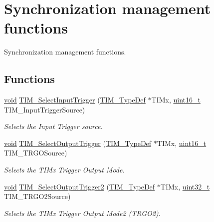 \hypertarget{group___t_i_m___group7}{\section{Synchronization management functions}
\label{group___t_i_m___group7}
}


Synchronization management functions.  


\subsection*{Functions}
\begin{DoxyCompactItemize}
\item 
\hyperlink{group___n_a_m_e_ga18028b8badbf1ea7e704ccac3c488e82}{void} \hyperlink{group___t_i_m___group7_ga4252583c6ae8a73d6fc66f7e951dbc35}{T\-I\-M\-\_\-\-Select\-Input\-Trigger} (\hyperlink{struct_t_i_m___type_def}{T\-I\-M\-\_\-\-Type\-Def} $\ast$T\-I\-Mx, \hyperlink{stdint_8h_a273cf69d639a59973b6019625df33e30}{uint16\-\_\-t} T\-I\-M\-\_\-\-Input\-Trigger\-Source)
\begin{DoxyCompactList}\small\item\em Selects the Input Trigger source. \end{DoxyCompactList}\item 
\hyperlink{group___n_a_m_e_ga18028b8badbf1ea7e704ccac3c488e82}{void} \hyperlink{group___t_i_m___group7_ga28745aaa549e2067e42c19569209e6c6}{T\-I\-M\-\_\-\-Select\-Output\-Trigger} (\hyperlink{struct_t_i_m___type_def}{T\-I\-M\-\_\-\-Type\-Def} $\ast$T\-I\-Mx, \hyperlink{stdint_8h_a273cf69d639a59973b6019625df33e30}{uint16\-\_\-t} T\-I\-M\-\_\-\-T\-R\-G\-O\-Source)
\begin{DoxyCompactList}\small\item\em Selects the T\-I\-Mx Trigger Output Mode. \end{DoxyCompactList}\item 
\hyperlink{group___n_a_m_e_ga18028b8badbf1ea7e704ccac3c488e82}{void} \hyperlink{group___t_i_m___group7_ga718633d185ae3c2b8bcfff242b09189e}{T\-I\-M\-\_\-\-Select\-Output\-Trigger2} (\hyperlink{struct_t_i_m___type_def}{T\-I\-M\-\_\-\-Type\-Def} $\ast$T\-I\-Mx, \hyperlink{stdint_8h_a435d1572bf3f880d55459d9805097f62}{uint32\-\_\-t} T\-I\-M\-\_\-\-T\-R\-G\-O2\-Source)
\begin{DoxyCompactList}\small\item\em Selects the T\-I\-Mx Trigger Output Mode2 (T\-R\-G\-O2). \end{DoxyCompactList}\item 

\end{DoxyCompactItemize}
